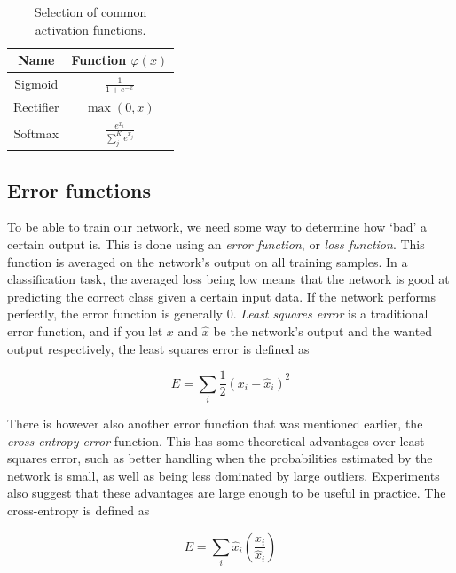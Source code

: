\documentclass{kththesis}
\renewcommand{\arraystretch}{1.2}
\begin{document}
\begin{table}[h]
  \renewcommand{\arraystretch}{1.2}
  \begin{center}
    \caption{Selection of common activation functions.}
    \label{tab:activation_functions}
    \begin{tabular}{cc}
      \textbf{Name} & \textbf{Function} $\varphi(x)$\\
      \toprule
      Sigmoid & $\displaystyle \frac{1}{1 + e^{-x}} $ \\[4mm]
      Rectifier & $\displaystyle \max(0, x)$ \\[3mm]
      Softmax & $\displaystyle \frac{e^{x_i}}{\sum_j^K{e^{x_j}}}$ \\
    \end{tabular}
  \end{center}
\end{table}

\subsection{Error functions}
To be able to train our network, we need some way to determine how `bad' a certain output is. This is done using an \textit{error function}, or \textit{loss function}. This function is averaged on the network's output on all training samples. In a classification task, the averaged loss being low means that the network is good at predicting the correct class given a certain input data. If the network performs perfectly, the error function is generally $0$. \textit{Least squares error} is a traditional error function, and if you let $x$ and $\hat{x}$ be the network's output and the wanted output respectively, the least squares error is defined as~\cite{mlfIntro}

\[ E = \sum_i{\frac{1}{2}(x_i - \hat{x}_i)^2} \] 

There is however also another error function that was mentioned earlier, the \textit{cross-entropy error} function. This has some theoretical advantages over least squares error, such as better handling when the probabilities estimated by the network is small, as well as being less dominated by large outliers. Experiments also suggest that these advantages are large enough to be useful in practice. The cross-entropy is defined as~\cite{crossentropy_squared}

\[ E = \sum_i{\hat{x}_i\left(\frac{x_i}{\hat{x}_i}\right)} \]
\end{document}
